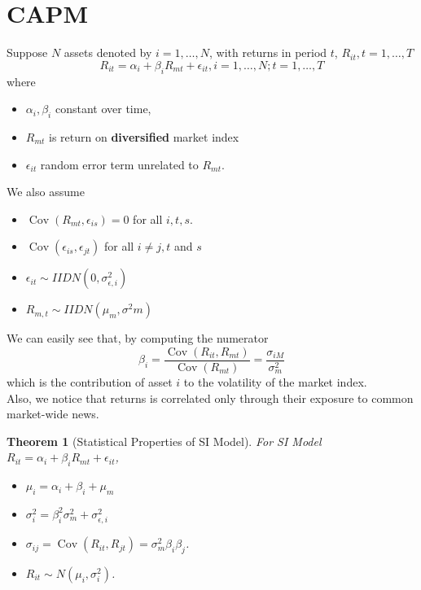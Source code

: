 \documentclass[11pt]{article}
\newtheorem{theorem}{Theorem}[section]
\theoremstyle{definition}
\DeclareMathOperator{\cov}{Cov}
\begin{document}
\section{CAPM}
Suppose $N$ assets denoted by $i = 1,\ldots, N$, with returns in period $t$, $R_{it}, t = 1,\ldots, T$
\[
R_{it} = \alpha_i + \beta_iR_{mt} + \epsilon_{it}, i = 1,\ldots, N; t=1,\ldots, T
\]
where
\begin{itemize}
\item $\alpha_i,\beta_i$ constant over time,
\item $R_{mt}$ is return on \textbf{diversified} market index
\item $\epsilon_{it}$ random error term unrelated to $R_{mt}$.
\end{itemize}
We also assume
\begin{itemize}
  \item $\cov(R_{mt}, \epsilon_{is}) = 0$ for all $i, t, s$.
  \item $\cov(\epsilon_{is}, \epsilon_{jt})$ for all $i\neq j, t$ and $s$
  \item $\epsilon_{it}\sim IID N(0, \sigma_{\epsilon, i}^2)$
  \item $R_{m,t}\sim IID N(\mu_m, \sigma^2 m)$
\end{itemize}
We can easily see that, by computing the numerator
\[
\beta_i = \frac{\cov(R_{it}, R_{mt})}{\cov(R_{mt})} = \frac{\sigma_{iM}}{\sigma_m^2}
\]
which is the contribution of asset $i$ to the volatility of the market index.\\
Also, we notice that returns is correlated only through their exposure to common market-wide news.\\
\begin{theorem}[Statistical Properties of SI Model]
For SI Model $R_{it} = \alpha_i + \beta_i R_{mt} + \epsilon_{it}$,
\begin{itemize}
  \item $\mu_i = \alpha_i + \beta_i + \mu_m$
  \item $\sigma_i^2 = \beta_i^2\sigma_m^2 + \sigma_{\epsilon, i}^2$
  \item $\sigma_{ij} = \cov(R_{it}, R_{jt}) = \sigma_m^2\beta_i\beta_j$.
  \item $R_{it}\sim N(\mu_i, \sigma_i^2)$.
\end{itemize}
\end{theorem}
\end{document}
